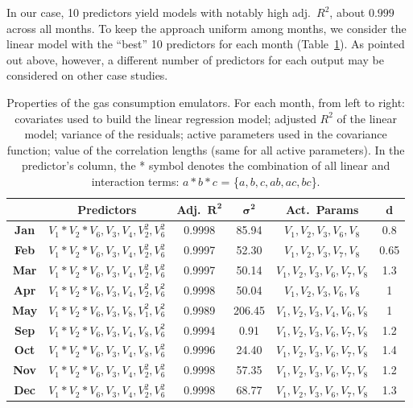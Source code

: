 \documentclass[preprint,12pt, sort&compress]{elsarticle}
\newcommand{\bd}[1]{\boldsymbol{#1}}
\begin{document}
In our case, 10 predictors yield models with notably high adj.~$R^2$, about $0.999$ across all months. To keep the approach uniform among months, we consider the linear model with the “best” 10 predictors for each month (Table~\ref{Table_Emulator}). As pointed out above, however, a different number of predictors for each output may be considered on other case studies. 

\begin{table}
\centering
\renewcommand{\arraystretch}{2}
\setlength{\tabcolsep}{1.5ex}
\caption{Properties of the gas consumption emulators. For each month, from left to right: covariates used to build the linear regression model; adjusted $R^2$ of the linear model; variance of the residuals; active parameters used in the covariance function; value of the correlation lengths (same for all active parameters). In the predictor’s column, the * symbol denotes the combination of all linear and interaction terms: $a*b*c$ = \{$a, b, c, ab, ac, bc$\}.
}
\label{Table_Emulator}

\begin{tabular}{*6c}
\toprule
                   &  {\bf Predictors}  &   {\bf Adj.~$\bd{R^2}$}  &   $\bd{\sigma^2}$  &   {\bf Act.~Params}  & $\bd d$  \\
\midrule
 {\bf Jan}   & $V_1*V_2*V_6, V_3, V_4, V_2^2, V_6^2$  & 0.9998  &  85.94  & $V_1, V_2, V_3, V_6, V_8$ & 0.8 \\
 {\bf Feb}   & $V_1*V_2*V_6, V_3, V_4, V_2^2, V_6^2$  & 0.9997  &  52.30  & $V_1, V_2, V_3, V_7, V_8$ & 0.65 \\
 {\bf Mar} &  $V_1*V_2*V_6, V_3, V_4, V_2^2, V_6^2$ & 0.9997  &  50.14  & $V_1, V_2, V_3, V_6, V_7, V_8$ & 1.3 \\
 {\bf Apr}  & $V_1*V_2*V_6, V_3, V_4, V_2^2, V_6^2$ &  0.9998  &  50.04  & $V_1, V_2, V_3, V_6, V_8$ & 1 \\
 {\bf May} & $V_1*V_2*V_6, V_3, V_8, V_1^2, V_6^2$ &  0.9989  & 206.45 & $V_1, V_2, V_3, V_4, V_6, V_8$ & 1 \\
 {\bf Sep}  & $V_1*V_2*V_6, V_3, V_4, V_8, V_6^2$      &  0.9994  &   0.91    & $V_1, V_2, V_3, V_6, V_7, V_8$ & 1.2 \\
 {\bf Oct}  &  $V_1*V_2*V_6, V_3, V_4, V_8, V_6^2$     &  0.9996   &  24.40  & $V_1, V_2, V_3, V_6, V_7, V_8$ & 1.4 \\
 {\bf Nov} & $V_1*V_2*V_6, V_3, V_4, V_2^2, V_6^2$ &  0.9998  &  57.35   & $V_1, V_2, V_3, V_6, V_7, V_8$ & 1.2 \\
 {\bf Dec} & $V_1*V_2*V_6, V_3, V_4, V_2^2, V_6^2$  &  0.9998  &  68.77  & $V_1, V_2, V_3, V_6, V_7, V_8$ & 1.3 \\
 \bottomrule
\end{tabular}
\end{table}
\end{document}
